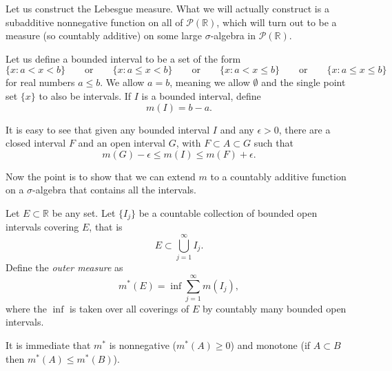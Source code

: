 \documentclass[12pt]{book}
\newcommand{\R}{{\mathbb{R}}}
\newcommand{\sP}{{\mathcal{P}}}
\theoremstyle{plain}
\theoremstyle{remark}
\theoremstyle{definition}
\theoremstyle{exercise}
\theoremstyle{example}
\begin{document}
\medskip

Let us construct the Lebesgue measure.  What we will actually construct
is a subadditive nonnegative function on all of $\sP(\R)$, which will turn out to be a
measure (so countably additive) on some large $\sigma$-algebra in $\sP(\R)$.

\medskip

Let us define a bounded interval to be a set of the form
$$
\{ x : a < x < b \}
\qquad \text{or} \qquad
\{ x : a \leq x < b \}
\qquad \text{or} \qquad
\{ x : a < x \leq b \}
\qquad \text{or} \qquad
\{ x : a \leq x \leq b \}
$$
for real numbers $a \leq b$.  We allow $a = b$, meaning we allow 
$\emptyset$ and the single point set $\{ x \}$ to also be intervals.
If $I$ is a bounded interval, define
$$
m(I) = b-a .
$$

%
%

It is easy to see that given any bounded interval $I$
and any $\epsilon > 0$, there are
a closed interval $F$ and an open interval $G$, with $F \subset A \subset G$
such that
$$
m(G) - \epsilon \leq m(I) \leq m(F) + \epsilon .
$$

Now the point is to show that we can extend $m$ to a countably additive
function on a $\sigma$-algebra that contains all the intervals.%

Let $E \subset \R$ be any set.  Let $\{ I_j \}$ be a countable
collection of bounded open intervals covering $E$,
that is
$$
E \subset \bigcup_{j=1}^\infty I_j .
$$
Define the \emph{outer measure}
as
$$
m^*(E) = \inf \sum_{j=1}^\infty m(I_j) ,
$$
where the $\inf$ is taken over all coverings of $E$ by countably many bounded open
intervals.

It is immediate that $m^*$ is nonnegative ($m^*(A) \geq 0$) and monotone (if $A \subset B$
then $m^*(A) \leq m^*(B)$).
\end{document}
